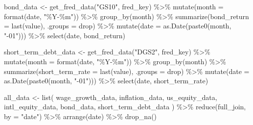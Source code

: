 \documentclass[
  letterpaper,
  DIV=11,
  numbers=noendperiod]{scrartcl}
\newenvironment{Shaded}{\begin{snugshade}}{\end{snugshade}}
\newcommand{\AttributeTok}[1]{\textcolor[rgb]{0.40,0.45,0.13}{#1}}
\newcommand{\FunctionTok}[1]{\textcolor[rgb]{0.28,0.35,0.67}{#1}}
\newcommand{\NormalTok}[1]{\textcolor[rgb]{0.00,0.23,0.31}{#1}}
\newcommand{\OtherTok}[1]{\textcolor[rgb]{0.00,0.23,0.31}{#1}}
\newcommand{\SpecialCharTok}[1]{\textcolor[rgb]{0.37,0.37,0.37}{#1}}
\newcommand{\StringTok}[1]{\textcolor[rgb]{0.13,0.47,0.30}{#1}}
\begin{document}
\begin{Shaded}
\begin{Highlighting}[]
\NormalTok{bond\_data }\OtherTok{\textless{}{-}} \FunctionTok{get\_fred\_data}\NormalTok{(}\StringTok{"GS10"}\NormalTok{, fred\_key) }\SpecialCharTok{\%\textgreater{}\%}
  \FunctionTok{mutate}\NormalTok{(}\AttributeTok{month =} \FunctionTok{format}\NormalTok{(date, }\StringTok{"\%Y{-}\%m"}\NormalTok{)) }\SpecialCharTok{\%\textgreater{}\%}
  \FunctionTok{group\_by}\NormalTok{(month) }\SpecialCharTok{\%\textgreater{}\%}
  \FunctionTok{summarize}\NormalTok{(}\AttributeTok{bond\_return =} \FunctionTok{last}\NormalTok{(value), }\AttributeTok{.groups =} \StringTok{\textquotesingle{}drop\textquotesingle{}}\NormalTok{) }\SpecialCharTok{\%\textgreater{}\%}
  \FunctionTok{mutate}\NormalTok{(}\AttributeTok{date =} \FunctionTok{as.Date}\NormalTok{(}\FunctionTok{paste0}\NormalTok{(month, }\StringTok{"{-}01"}\NormalTok{))) }\SpecialCharTok{\%\textgreater{}\%}
  \FunctionTok{select}\NormalTok{(date, bond\_return)}

\NormalTok{short\_term\_debt\_data }\OtherTok{\textless{}{-}} \FunctionTok{get\_fred\_data}\NormalTok{(}\StringTok{"DGS2"}\NormalTok{, fred\_key) }\SpecialCharTok{\%\textgreater{}\%}
  \FunctionTok{mutate}\NormalTok{(}\AttributeTok{month =} \FunctionTok{format}\NormalTok{(date, }\StringTok{"\%Y{-}\%m"}\NormalTok{)) }\SpecialCharTok{\%\textgreater{}\%}
  \FunctionTok{group\_by}\NormalTok{(month) }\SpecialCharTok{\%\textgreater{}\%}
  \FunctionTok{summarize}\NormalTok{(}\AttributeTok{short\_term\_rate =} \FunctionTok{last}\NormalTok{(value), }\AttributeTok{.groups =} \StringTok{\textquotesingle{}drop\textquotesingle{}}\NormalTok{) }\SpecialCharTok{\%\textgreater{}\%}
  \FunctionTok{mutate}\NormalTok{(}\AttributeTok{date =} \FunctionTok{as.Date}\NormalTok{(}\FunctionTok{paste0}\NormalTok{(month, }\StringTok{"{-}01"}\NormalTok{))) }\SpecialCharTok{\%\textgreater{}\%}
  \FunctionTok{select}\NormalTok{(date, short\_term\_rate)}

\NormalTok{all\_data }\OtherTok{\textless{}{-}} \FunctionTok{list}\NormalTok{(}
\NormalTok{  wage\_growth\_data,}
\NormalTok{  inflation\_data,}
\NormalTok{  us\_equity\_data,}
\NormalTok{  intl\_equity\_data,}
\NormalTok{  bond\_data,}
\NormalTok{  short\_term\_debt\_data}
\NormalTok{) }\SpecialCharTok{\%\textgreater{}\%}
  \FunctionTok{reduce}\NormalTok{(full\_join, }\AttributeTok{by =} \StringTok{"date"}\NormalTok{) }\SpecialCharTok{\%\textgreater{}\%}
  \FunctionTok{arrange}\NormalTok{(date) }\SpecialCharTok{\%\textgreater{}\%}
  \FunctionTok{drop\_na}\NormalTok{()  }
\end{Highlighting}
\end{Shaded}
\end{document}
